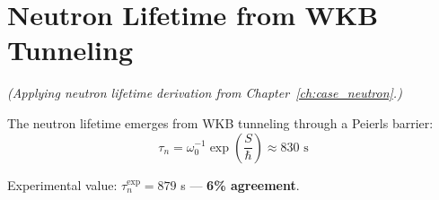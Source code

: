 \section{Neutron Lifetime from WKB Tunneling}
\label{sec:ch3_neutron}

\begin{corollary}
\label{cor:ch3_neutron}
\tagDc{}
\textit{(Applying neutron lifetime derivation from Chapter~\ref{ch:case_neutron}.)}

The neutron lifetime emerges from WKB tunneling through a Peierls barrier:
\begin{equation}
\boxed{\tau_n = \omega_0^{-1} \exp\left(\frac{S}{\hbar}\right) \approx 830 \text{ s}}
\end{equation}

Experimental value: $\tau_n^{\text{exp}} = 879$ s \tagBL{} --- \textbf{6\% agreement}.
\end{corollary}

